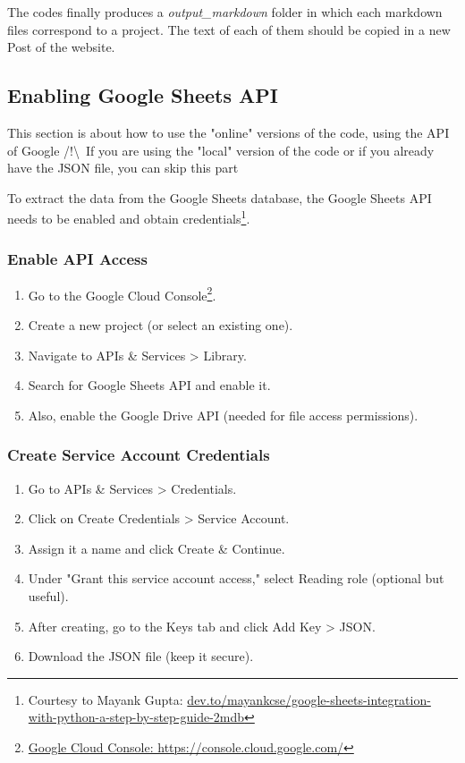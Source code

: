 The codes finally produces a \textit{output\_markdown} folder in which each markdown files correspond to a project. The text of each of them should be  copied in a new Post of the website.

\subsection{Enabling Google Sheets API}\label{ssec:API}
This section is about how to use the "online" versions of the code, using the API of Google
/!\textbackslash \ If you are using the "local" version of the code or if you already have the JSON file, you can skip this part

To extract the data from the Google Sheets database, the Google Sheets API needs to be enabled and obtain credentials\footnote{Courtesy to Mayank Gupta: \href{https://dev.to/mayankcse/google-sheets-integration-with-python-a-step-by-step-guide-2mdb}{dev.to/mayankcse/google-sheets-integration-with-python-a-step-by-step-guide-2mdb}}.

\subsubsection*{Enable API Access}

\begin{enumerate}
    \item Go to the Google Cloud Console\footnote{\href{https://console.cloud.google.com/}{Google Cloud Console: https://console.cloud.google.com/}}.
    \item Create a new project (or select an existing one).
    \item Navigate to APIs \& Services > Library.
    \item Search for Google Sheets API and enable it.
    \item Also, enable the Google Drive API (needed for file access permissions).
\end{enumerate}

\subsubsection*{Create Service Account Credentials}

\begin{enumerate}
    \item Go to APIs \& Services > Credentials.
    \item Click on Create Credentials > Service Account.
    \item Assign it a name and click Create \& Continue.
    \item Under "Grant this service account access," select Reading role (optional but useful).
    \item After creating, go to the Keys tab and click Add Key > JSON.
    \item Download the JSON file (keep it secure).
\end{enumerate}

